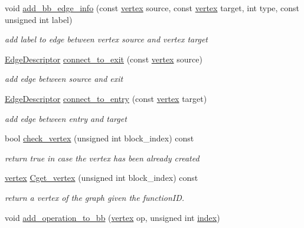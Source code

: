 \begin{DoxyCompactItemize}
void \hyperlink{classBasicBlocksGraphConstructor_ace93882445e53a5c1178e584e39b36f1}{add\+\_\+bb\+\_\+edge\+\_\+info} (const \hyperlink{graph_8hpp_abefdcf0544e601805af44eca032cca14}{vertex} source, const \hyperlink{graph_8hpp_abefdcf0544e601805af44eca032cca14}{vertex} target, int type, const unsigned int label)
\begin{DoxyCompactList}\small\item\em add label to edge between vertex source and vertex target \end{DoxyCompactList}\item 
\hyperlink{graph_8hpp_a9eb9afea34e09f484b21f2efd263dd48}{Edge\+Descriptor} \hyperlink{classBasicBlocksGraphConstructor_ab3c2b2d78837ddceb07ce85913aa9eb2}{connect\+\_\+to\+\_\+exit} (const \hyperlink{graph_8hpp_abefdcf0544e601805af44eca032cca14}{vertex} source)
\begin{DoxyCompactList}\small\item\em add edge between source and exit \end{DoxyCompactList}\item 
\hyperlink{graph_8hpp_a9eb9afea34e09f484b21f2efd263dd48}{Edge\+Descriptor} \hyperlink{classBasicBlocksGraphConstructor_a953d6610d95301b93d33117d9cdc8f65}{connect\+\_\+to\+\_\+entry} (const \hyperlink{graph_8hpp_abefdcf0544e601805af44eca032cca14}{vertex} target)
\begin{DoxyCompactList}\small\item\em add edge between entry and target \end{DoxyCompactList}\item 
bool \hyperlink{classBasicBlocksGraphConstructor_a96fd9387eca2922fcbd13002c95a30c1}{check\+\_\+vertex} (unsigned int block\+\_\+index) const
\begin{DoxyCompactList}\small\item\em return true in case the vertex has been already created \end{DoxyCompactList}\item 
\hyperlink{graph_8hpp_abefdcf0544e601805af44eca032cca14}{vertex} \hyperlink{classBasicBlocksGraphConstructor_a75dc45851229f515c373cafdc845e877}{Cget\+\_\+vertex} (unsigned int block\+\_\+index) const
\begin{DoxyCompactList}\small\item\em return a vertex of the graph given the function\+ID. \end{DoxyCompactList}\item 
void \hyperlink{classBasicBlocksGraphConstructor_a51ceaaa63ee039bd69ddeb6d2822db19}{add\+\_\+operation\+\_\+to\+\_\+bb} (\hyperlink{graph_8hpp_abefdcf0544e601805af44eca032cca14}{vertex} op, unsigned int \hyperlink{tutorial__pact__2019_2Introduction_2third_2include_2Keccak_8h_a028c9bdc8344cca38ab522a337074797}{index})

\end{DoxyCompactItemize}

